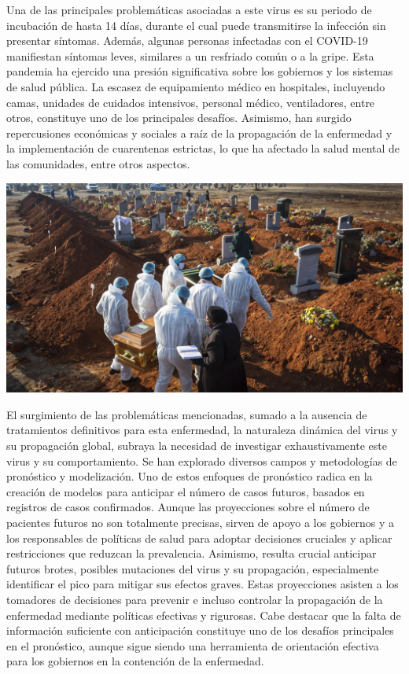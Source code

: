 \documentclass[
  us-letterpaper,
]{scrreprt}
\theoremstyle{definition}
\theoremstyle{plain}
\theoremstyle{plain}
\theoremstyle{definition}
\theoremstyle{remark}
\begin{document}
Una de las principales problemáticas asociadas a este virus es su
periodo de incubación de hasta 14 días, durante el cual puede
transmitirse la infección sin presentar síntomas. Además, algunas
personas infectadas con el COVID-19 manifiestan síntomas leves,
similares a un resfriado común o a la gripe. Esta pandemia ha ejercido
una presión significativa sobre los gobiernos y los sistemas de salud
pública. La escasez de equipamiento médico en hospitales, incluyendo
camas, unidades de cuidados intensivos, personal médico, ventiladores,
entre otros, constituye uno de los principales desafíos. Asimismo, han
surgido repercusiones económicas y sociales a raíz de la propagación de
la enfermedad y la implementación de cuarentenas estrictas, lo que ha
afectado la salud mental de las comunidades, entre otros aspectos.

\begin{center}
\includegraphics[width=5.3125in,height=\textheight]{Imagenes/COVID.jpeg}
\end{center}

El surgimiento de las problemáticas mencionadas, sumado a la ausencia de
tratamientos definitivos para esta enfermedad, la naturaleza dinámica
del virus y su propagación global, subraya la necesidad de investigar
exhaustivamente este virus y su comportamiento. Se han explorado
diversos campos y metodologías de pronóstico y modelización. Uno de
estos enfoques de pronóstico radica en la creación de modelos para
anticipar el número de casos futuros, basados en registros de casos
confirmados. Aunque las proyecciones sobre el número de pacientes
futuros no son totalmente precisas, sirven de apoyo a los gobiernos y a
los responsables de políticas de salud para adoptar decisiones cruciales
y aplicar restricciones que reduzcan la prevalencia. Asimismo, resulta
crucial anticipar futuros brotes, posibles mutaciones del virus y su
propagación, especialmente identificar el pico para mitigar sus efectos
graves. Estas proyecciones asisten a los tomadores de decisiones para
prevenir e incluso controlar la propagación de la enfermedad mediante
políticas efectivas y rigurosas. Cabe destacar que la falta de
información suficiente con anticipación constituye uno de los desafíos
principales en el pronóstico, aunque sigue siendo una herramienta de
orientación efectiva para los gobiernos en la contención de la
enfermedad.
\end{document}
